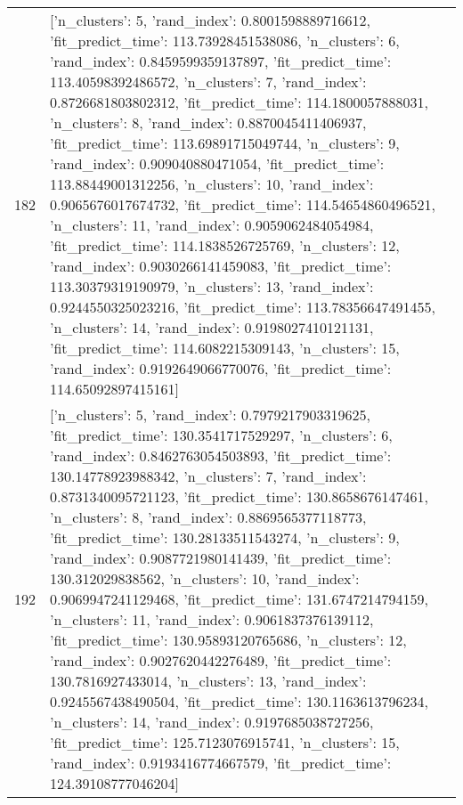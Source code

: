 \begin{tabular}{rl}
182 & [{'n_clusters': 5, 'rand_index': 0.8001598889716612, 'fit_predict_time': 113.73928451538086}, {'n_clusters': 6, 'rand_index': 0.8459599359137897, 'fit_predict_time': 113.40598392486572}, {'n_clusters': 7, 'rand_index': 0.8726681803802312, 'fit_predict_time': 114.1800057888031}, {'n_clusters': 8, 'rand_index': 0.8870045411406937, 'fit_predict_time': 113.69891715049744}, {'n_clusters': 9, 'rand_index': 0.909040880471054, 'fit_predict_time': 113.88449001312256}, {'n_clusters': 10, 'rand_index': 0.9065676017674732, 'fit_predict_time': 114.54654860496521}, {'n_clusters': 11, 'rand_index': 0.9059062484054984, 'fit_predict_time': 114.1838526725769}, {'n_clusters': 12, 'rand_index': 0.9030266141459083, 'fit_predict_time': 113.30379319190979}, {'n_clusters': 13, 'rand_index': 0.9244550325023216, 'fit_predict_time': 113.78356647491455}, {'n_clusters': 14, 'rand_index': 0.9198027410121131, 'fit_predict_time': 114.6082215309143}, {'n_clusters': 15, 'rand_index': 0.9192649066770076, 'fit_predict_time': 114.65092897415161}] \\
192 & [{'n_clusters': 5, 'rand_index': 0.7979217903319625, 'fit_predict_time': 130.3541717529297}, {'n_clusters': 6, 'rand_index': 0.8462763054503893, 'fit_predict_time': 130.14778923988342}, {'n_clusters': 7, 'rand_index': 0.8731340095721123, 'fit_predict_time': 130.8658676147461}, {'n_clusters': 8, 'rand_index': 0.8869565377118773, 'fit_predict_time': 130.28133511543274}, {'n_clusters': 9, 'rand_index': 0.9087721980141439, 'fit_predict_time': 130.312029838562}, {'n_clusters': 10, 'rand_index': 0.9069947241129468, 'fit_predict_time': 131.6747214794159}, {'n_clusters': 11, 'rand_index': 0.9061837376139112, 'fit_predict_time': 130.95893120765686}, {'n_clusters': 12, 'rand_index': 0.9027620442276489, 'fit_predict_time': 130.7816927433014}, {'n_clusters': 13, 'rand_index': 0.9245567438490504, 'fit_predict_time': 130.1163613796234}, {'n_clusters': 14, 'rand_index': 0.9197685038727256, 'fit_predict_time': 125.7123076915741}, {'n_clusters': 15, 'rand_index': 0.9193416774667579, 'fit_predict_time': 124.39108777046204}] \\
\bottomrule
\end{tabular}
